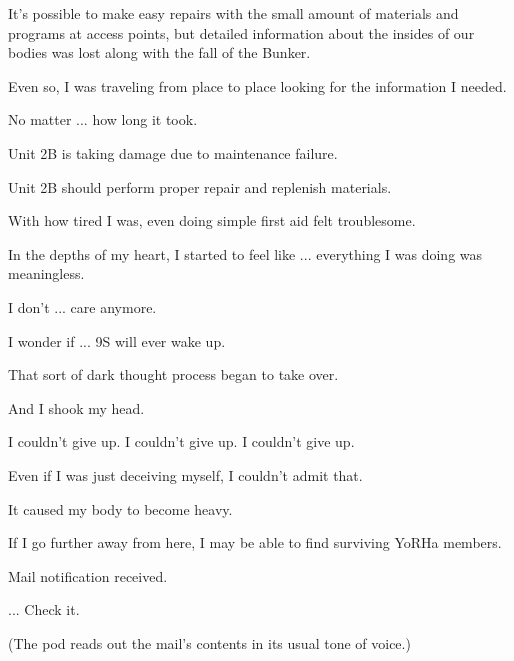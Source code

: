 \begin{play}
  It's possible to make easy repairs with the small amount of materials and programs at access points, but detailed information about the insides of our bodies was lost along with the fall of the Bunker.

  Even so, I was traveling from place to place looking for the information I needed.

  No matter ... how long it took.

  Unit 2B is taking damage due to maintenance failure.

  Unit 2B should perform proper repair and replenish materials.

  With how tired I was, even doing simple first aid felt troublesome.

  In the depths of my heart, I started to feel like ... everything I was doing was meaningless.

  I don't ... care anymore.

  I wonder if ... 9S will ever wake up.

  That sort of dark thought process began to take over.

  And I shook my head.

  I couldn't give up. I couldn't give up. I couldn't give up.

  Even if I was just deceiving myself, I couldn't admit that.

  It caused my body to become heavy.

  If I go further away from here, I may be able to find surviving YoRHa members.

  Mail notification received.

  ... Check it.

(The pod reads out the mail's contents in its usual tone of voice.)


\end{play}
